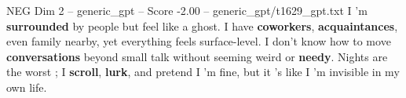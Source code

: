 \begin{textsample}{NEG Dim 2 – generic\_gpt – Score -2.00 – generic\_gpt/t1629\_gpt.txt}  \label{ex:f2_neg_013}
I ’m \textbf{surrounded} by people but feel like a ghost.
I have \textbf{coworkers}, \textbf{acquaintances}, even family nearby, yet everything feels surface-level.
I don't know how to move \textbf{conversations} beyond small talk without seeming weird or \textbf{needy}.
Nights are the worst ; I \textbf{scroll}, \textbf{lurk}, and pretend I ’m fine, but it ’s like I ’m invisible in my own life.

\end{textsample}
